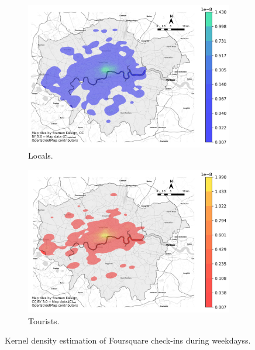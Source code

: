 \documentclass{article}
\begin{document}
\begin{figure}[!h]

\begin{subfigure}{0.5\textwidth}
\includegraphics[width=1\linewidth]{figures/kde_locals_weekday.png} 
\caption{Locals.}
\label{fig:kde_locals_weekday}
\end{subfigure}
\begin{subfigure}{0.5\textwidth}
\includegraphics[width=1\linewidth]{figures/kde_tourists_weekday.png}
\caption{Tourists.}
\label{fig:kde_tourists_weekday}
\end{subfigure}

\caption{Kernel density estimation of Foursquare check-ins during weekdayss.} \label{fig:kde_weekday}
\end{figure}
\end{document}
